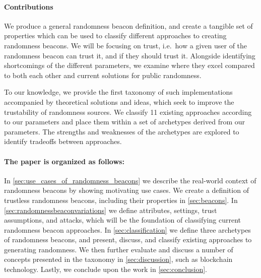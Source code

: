 \paragraph{Contributions}\label{subsec:contributions}
We produce a general randomness beacon definition, and create a tangible set of properties which can be used to classify different approaches to creating randomness beacons.
We will be focusing on trust, i.e.\ how a given user of the randomness beacon can trust it, and if they should trust it.
Alongside identifying shortcomings of the different parameters, we examine where they excel compared to both each other and current solutions for public randomness.

To our knowledge, we provide the first taxonomy of such implementations accompanied by theoretical solutions and ideas, which seek to improve the trustability of randomness sources.
We classify 11 existing approaches according to our parameters and place them within a set of archetypes derived from our parameters. The strengths and weaknesses of the archetypes are explored to identify tradeoffs between approaches.


\paragraph{The paper is organized as follows:}
In \cref{sec:use_cases_of_randomness_beacons} we describe the real-world context of randomness beacons by showing motivating use cases.
We create a definition of trustless randomness beacons, including their properties in \cref{sec:beacons}. In \cref{sec:randomnessbeaconvariations} we define attributes, settings, trust assumptions, and attacks, which will be the foundation of classifying current randomness beacon approaches.
In \cref{sec:classification} we define three archetypes of randomness beacons, and present, discuss, and classify existing approaches to generating randomness.
We then further evaluate and discuss a number of concepts presented in the taxonomy in \cref{sec:discussion}, such as blockchain technology.
Lastly, we conclude upon the work in \cref{sec:conclusion}.
